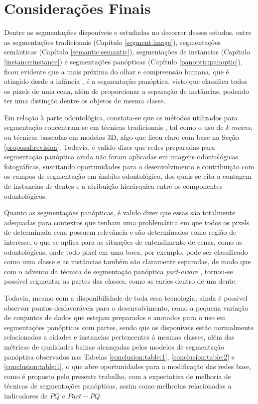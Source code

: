 \newpage
\clearpage
\section{Considerações Finais}
\label{final:final}

Dentre as segmentações disponíveis e estudadas no decorrer desses estudos, entre as segmentações tradicionais (Capítulo \ref{segment:image}), segmentações semânticas (Capítulo \ref{semantic:semantic}), segmentações de instancias (Capítulo \ref{instance:instance}) e segmentações panópticas (Capítulo \ref{panoptic:panoptic}), ficou evidente que a mais próxima do olhar e compreensão humana, que é atingido desde a infância \cite{Mohan2020}, é a segmentação panóptica, visto que classifica todos os pixels de uma cena, além de proporcionar a separação de instâncias, podendo ter uma distinção dentre os objetos de mesma classe.

Em relação à parte odontológica, constata-se que os métodos utilizados para segmentação concentram-se em técnicas tradicionais \cite{Hammad2020}, tal como o uso de \textit{k-means}, ou técnicas baseadas em modelos 3D, algo que ficou claro com base na Seção \ref{proposal:revision}. Todavia, é valido dizer que redes preparadas para segmentação panóptica ainda não foram aplicadas em imagens odontológicas fotográficas, suscitando oportunidades para o desenvolvimento e contribuição com os campos de segmentação em âmbito odontológico, dos quais se cita a contagem de instancias de dentes e a atribuição hierárquica entre os componentes odontológicos.

Quanto as segmentações panópticas, é valido dizer que essas são totalmente adequadas para contextos que tenham uma problemática em que todos os pixels de determinada cena possuem relevância e são determinados como região de interesse, o que se aplica para as situações de entendimento de cenas, como as odontológicas, onde todo pixel em uma boca, por exemplo, pode ser classificado como uma classe e as instâncias também são claramente separadas, de modo que com o advento da técnica de segmentação panóptica \textit{part-aware} \cite{DeGeus2021}, tornou-se possível segmentar as partes das classes, como as caries dentro de um dente.

Todavia, mesmo com a disponibilidade de toda essa tecnologia, ainda é possível observar pontos desfavoráveis para o desenvolvimento, como a pequena variação de conjuntos de dados que estejam preparados e anotados para o uso em segmentações panópticas com partes, sendo que os disponíveis estão normalmente relacionados a cidades e instancias pertencentes à mesmas classes, além das métricas de qualidades baixas alcançadas pelos modelos de segmentação panóptica observados nas Tabelas \ref{conclusion:table:1}, \ref{conclusion:table:2} e \ref{conclusion:table:1}, o que abre oportunidades para a modificação das redes base, como é proposto pelo presente trabalho, com a expectativa de melhoria de técnicas de segmentações panópticas, assim como melhorias relacionadas a indicadores de $PQ$ e $Part-PQ$.

